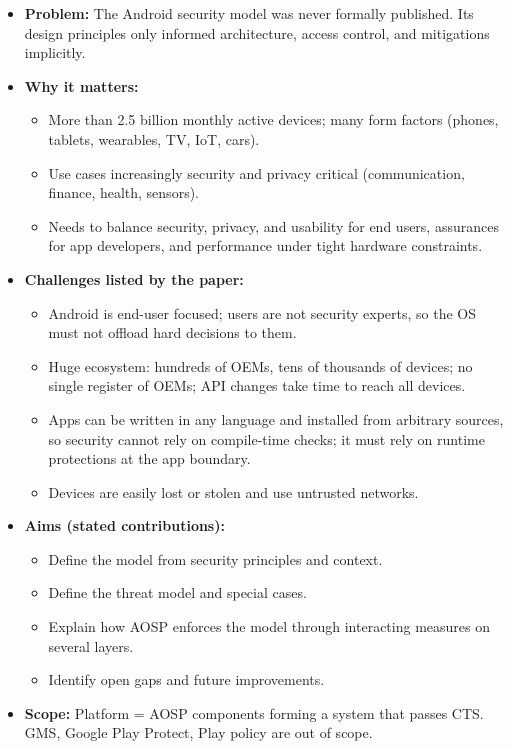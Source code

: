 \documentclass[11pt,a4paper]{article}
\begin{document}
\begin{enumerate}
    \begin{itemize}[leftmargin=*,itemsep=1pt,topsep=2pt]
        \item \textbf{Problem:} The Android security model was never formally published. Its design principles only informed architecture, access control, and mitigations implicitly.
        \item \textbf{Why it matters:}
        \begin{itemize}[itemsep=0pt]
            \item More than 2.5 billion monthly active devices; many form factors (phones, tablets, wearables, TV, IoT, cars).
            \item Use cases increasingly security and privacy critical (communication, finance, health, sensors).
            \item Needs to balance security, privacy, and usability for end users, assurances for app developers, and performance under tight hardware constraints.
        \end{itemize}
        \item \textbf{Challenges listed by the paper:}
        \begin{itemize}[itemsep=0pt]
            \item Android is end-user focused; users are not security experts, so the OS must not offload hard decisions to them.
            \item Huge ecosystem: hundreds of OEMs, tens of thousands of devices; no single register of OEMs; API changes take time to reach all devices.
            \item Apps can be written in any language and installed from arbitrary sources, so security cannot rely on compile-time checks; it must rely on runtime protections at the app boundary.
            \item Devices are easily lost or stolen and use untrusted networks.
        \end{itemize}
        \item \textbf{Aims (stated contributions):}
        \begin{itemize}[itemsep=0pt]
            \item Define the model from security principles and context.
            \item Define the threat model and special cases.
            \item Explain how AOSP enforces the model through interacting measures on several layers.
            \item Identify open gaps and future improvements.
        \end{itemize}
        \item \textbf{Scope:} Platform = AOSP components forming a system that passes CTS. GMS, Google Play Protect, Play policy are out of scope.
    \end{itemize}


\end{enumerate}
\end{document}
